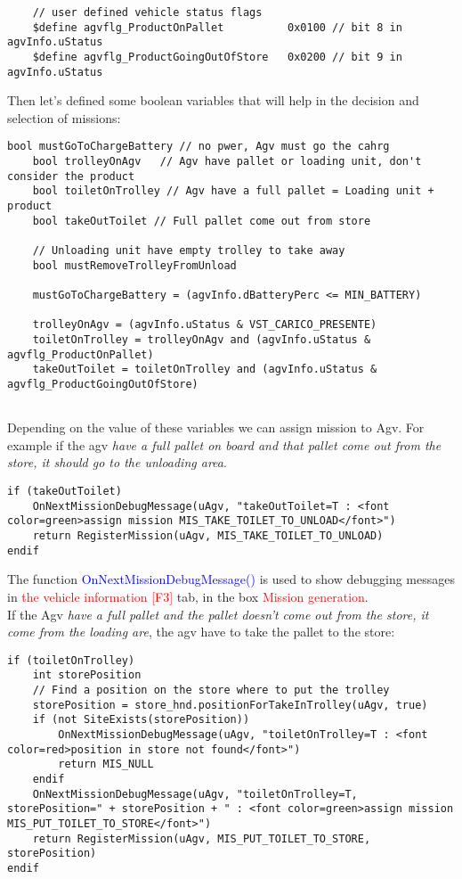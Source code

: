 \begin{lstlisting}
	// user defined vehicle status flags
	$define agvflg_ProductOnPallet			0x0100 // bit 8 in agvInfo.uStatus
	$define agvflg_ProductGoingOutOfStore	0x0200 // bit 9 in agvInfo.uStatus
\end{lstlisting}

Then let's defined some boolean variables that will help in the decision and selection of missions:

\begin{lstlisting}[caption = Desision variables or plant status]
	bool mustGoToChargeBattery // no pwer, Agv must go the cahrg
	bool trolleyOnAgv	// Agv have pallet or loading unit, don't consider the product
	bool toiletOnTrolley // Agv have a full pallet = Loading unit + product
	bool takeOutToilet // Full pallet come out from store
	
	// Unloading unit have empty trolley to take away
	bool mustRemoveTrolleyFromUnload
	
	mustGoToChargeBattery = (agvInfo.dBatteryPerc <= MIN_BATTERY)
	
	trolleyOnAgv = (agvInfo.uStatus & VST_CARICO_PRESENTE)
	toiletOnTrolley = trolleyOnAgv and (agvInfo.uStatus & agvflg_ProductOnPallet)
	takeOutToilet = toiletOnTrolley and (agvInfo.uStatus & agvflg_ProductGoingOutOfStore)
	
\end{lstlisting} 

Depending on the value of these variables we can assign mission to Agv. For example if the agv \textit{have a full pallet on board and that pallet come out from the store, it should go to the unloading area}.
\begin{lstlisting}[caption= Mission to unloaing area]
if (takeOutToilet)
	OnNextMissionDebugMessage(uAgv, "takeOutToilet=T : <font color=green>assign mission MIS_TAKE_TOILET_TO_UNLOAD</font>")
	return RegisterMission(uAgv, MIS_TAKE_TOILET_TO_UNLOAD)
endif
\end{lstlisting}

The function \textcolor{blue}{OnNextMissionDebugMessage()} is used to show debugging messages in  \textcolor{red}{the vehicle information [F3]} tab, in the box \textcolor{red}{Mission generation}.\\

If the Agv \textit{have a full pallet and the pallet doesn't come out from the store, it come from the loading are}, the agv have to take the pallet to the store:

\begin{lstlisting}[caption= Mission take full pallet into store]
if (toiletOnTrolley)
	int storePosition
	// Find a position on the store where to put the trolley
	storePosition = store_hnd.positionForTakeInTrolley(uAgv, true)
	if (not SiteExists(storePosition))
		OnNextMissionDebugMessage(uAgv, "toiletOnTrolley=T : <font color=red>position in store not found</font>")
		return MIS_NULL
	endif
	OnNextMissionDebugMessage(uAgv, "toiletOnTrolley=T, storePosition=" + storePosition + " : <font color=green>assign mission MIS_PUT_TOILET_TO_STORE</font>")
	return RegisterMission(uAgv, MIS_PUT_TOILET_TO_STORE, storePosition)
endif	
\end{lstlisting}

